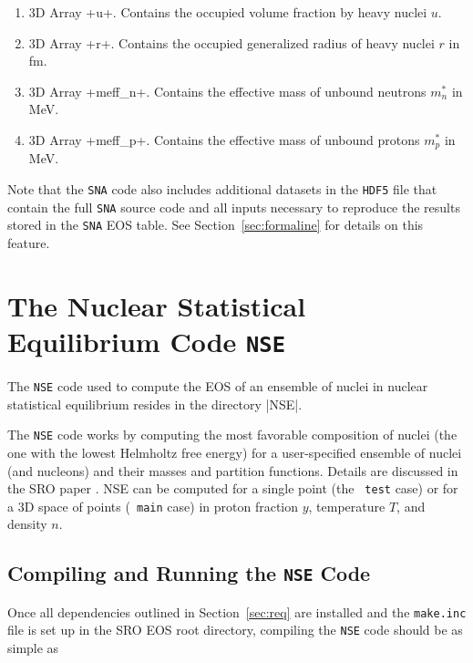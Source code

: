 \documentclass[letterpaper,11pt]{refart}
\begin{document}
\begin{enumerate}
 \item 3D Array \verbprm+u+. Contains the occupied volume fraction by
   heavy nuclei $u$. 

 \item 3D Array \verbprm+r+. Contains the occupied generalized radius
   of heavy nuclei $r$ in fm. 

 \item 3D Array
   \verbprm+meff_n+. Contains the effective mass of unbound neutrons $m^*_n$ in MeV.

 \item 3D Array \verbprm+meff_p+. Contains the effective mass of
   unbound protons $m^*_p$ in MeV.

\end{enumerate}

\smallskip
Note that the \texttt{SNA} code also includes additional datasets in
the \texttt{HDF5} file that contain the full \texttt{SNA} source code
and all inputs necessary to reproduce the results stored in the
\texttt{SNA} EOS table. See Section~\ref{sec:formaline} for details on
this feature.


\section{The Nuclear Statistical Equilibrium Code \texttt{NSE}}\label{sec:NSE}

The \texttt{NSE} code used to compute the EOS of an ensemble of nuclei
in nuclear statistical equilibrium resides in the directory
\verbfile|NSE|.


The \texttt{NSE} code works by computing the most favorable
composition of nuclei (the one with the lowest Helmholtz free energy)
for a user-specified ensemble of nuclei (and nucleons) and their
masses and partition functions. Details are discussed in the SRO paper
\cite{schneider:17}. NSE can be computed for a single point (the
\texttt{\color{magenta} test} case) or for a 3D space of points
(\texttt{\color{magenta} main} case) in proton fraction $y$,
temperature $T$, and density $n$.

\subsection{Compiling and Running the \texttt{NSE} Code}\label{ssec:NSE_dep}

Once all dependencies outlined in Section~\ref{sec:req} are installed
and the \texttt{make.inc} file is set up in the SRO EOS root
directory, compiling the \verb|NSE| code should be as simple as
\end{document}
